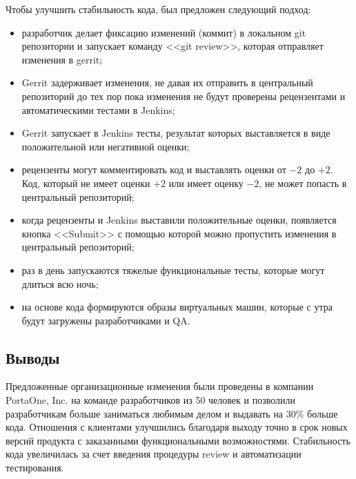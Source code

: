 \documentclass[10pt, a5paper]{article}
\begin{document}
Чтобы улучшить стабильность кода, был предложен следующий подход:

\begin{itemize}
  \item разработчик делает фиксацию изменений (коммит) в локальном git репозитории и запускает команду <<git review>>, которая отправляет изменения в gerrit;
  \item Gerrit задерживает изменения, не давая их отправить в центральный репозиторий до тех пор пока изменения не будут проверены рецензентами и автоматическими тестами в Jenkins;
  \item Gerrit запускает в Jenkins тесты, результат которых выставляется в виде положительной или негативной оценки;
  \item рецензенты могут комментировать код и выставлять оценки от $-2$ до $+2$. Код, который не имеет оценки $+2$ или имеет оценку $-2$, не может попасть в центральный репозиторий;
  \item когда рецензенты и Jenkins выставили положительные оценки, появляется кнопка <<Submit>> с помощью которой можно пропустить изменения в центральный репозиторий;
  \item раз в день запускаются тяжелые функциональные тесты, которые могут длиться всю ночь;
  \item на основе кода формируются образы виртуальных машин, которые с утра будут загружены разработчиками и QA.
\end{itemize}

\subsection*{Выводы}

Предложенные организационные изменения были проведены в компании PortaOne, Inc. на команде разработчиков из 50 человек и позволили разработчикам больше заниматься любимым делом и выдавать на 30\% больше кода. Отношения с клиентами улучшились благодаря выходу точно в срок новых версий продукта с заказанными функциональными возможностями. Стабильность кода увеличилась за счет введения процедуры review и автоматизации тестирования.
\end{document}
